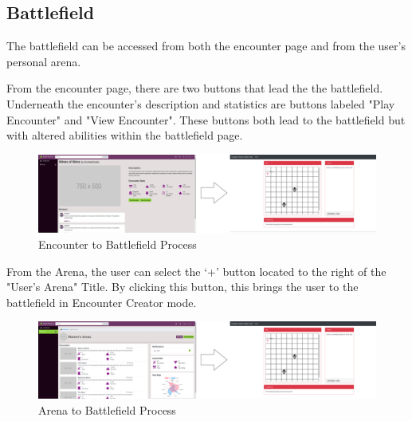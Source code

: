 \documentclass[12pt,a4paper]{report}
\begin{document}
		\subsection{Battlefield}
		The battlefield can be accessed from both the encounter page and from the user's personal arena. 
		
		From the encounter page, there are two buttons that lead the the battlefield. Underneath the encounter's description and statistics are buttons labeled "Play Encounter" and "View Encounter". These buttons both lead to the battlefield but with altered abilities within the battlefield page. 
		\begin{figure}[H]	
			\centering
			\centerline{\includegraphics[scale=.16]{battlefieldEncounterNav}}
			\caption{Encounter to Battlefield Process}
			\label{fig: Encounter to Battlefield}
		\end{figure}
		From the Arena, the user can select the `+' button located to the right of the "User's Arena" Title. By clicking this button, this brings the user to the battlefield in Encounter Creator mode. 
		\begin{figure}[H]	
			\centering
			\centerline{\includegraphics[scale=.16]{battlefieldArenaNav}}
			\caption{Arena to Battlefield Process}
			\label{fig: Arena to Battlefield}
		\end{figure}
	\newpage
\end{document}
